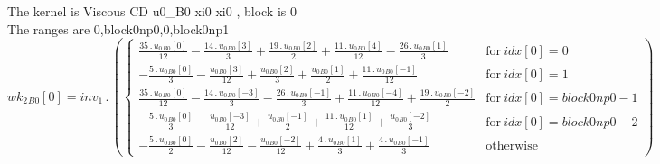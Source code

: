 \documentclass{article}
\begin{document}
\noindent The kernel is Viscous CD u0_B0 xi0 xi0 , block is 0\\\noindent The ranges are 0,block0np0,0,block0np1\\\begin{dmath}{wk_{2}{_{B0}}}[{0}] = inv_1 \,.\, \left(\begin{cases} \frac{35 \,.\, {u_{0}{_{B0}}}[{0}]}{12} - \frac{14 \,.\, {u_{0}{_{B0}}}[{3}]}{3} + \frac{19 \,.\, {u_{0}{_{B0}}}[{2}]}{2} + \frac{11 \,.\, {u_{0}{_{B0}}}[{4}]}{12} - \frac{26 \,.\, 
{u_{0}{_{B0}}}[{1}]}{3} & \text{for}\: {idx}[{0}] = 0 \\- \frac{5 \,.\, {u_{0}{_{B0}}}[{0}]}{3} - \frac{{u_{0}{_{B0}}}[{3}]}{12} + \frac{{u_{0}{_{B0}}}[{2}]}{3} + \frac{{u_{0}{_{B0}}}[{1}]}{2} + \frac{11 \,.\, {u_{0}{_{B0}}}[{-1}]}{12} & \text{for}\: 
{idx}[{0}] = 1 \\\frac{35 \,.\, {u_{0}{_{B0}}}[{0}]}{12} - \frac{14 \,.\, {u_{0}{_{B0}}}[{-3}]}{3} - \frac{26 \,.\, {u_{0}{_{B0}}}[{-1}]}{3} + \frac{11 \,.\, {u_{0}{_{B0}}}[{-4}]}{12} + \frac{19 \,.\, {u_{0}{_{B0}}}[{-2}]}{2} & \text{for}\: 
{idx}[{0}] = block0np0 - 1 \\- \frac{5 \,.\, {u_{0}{_{B0}}}[{0}]}{3} - \frac{{u_{0}{_{B0}}}[{-3}]}{12} + \frac{{u_{0}{_{B0}}}[{-1}]}{2} + \frac{11 \,.\, {u_{0}{_{B0}}}[{1}]}{12} + \frac{{u_{0}{_{B0}}}[{-2}]}{3} & \text{for}\: {idx}[{0}] = block0np0 - 
2 \\- \frac{5 \,.\, {u_{0}{_{B0}}}[{0}]}{2} - \frac{{u_{0}{_{B0}}}[{2}]}{12} - \frac{{u_{0}{_{B0}}}[{-2}]}{12} + \frac{4 \,.\, {u_{0}{_{B0}}}[{1}]}{3} + \frac{4 \,.\, {u_{0}{_{B0}}}[{-1}]}{3} & \text{otherwise} \end{cases}\right)\end{dmath}
\end{document}
